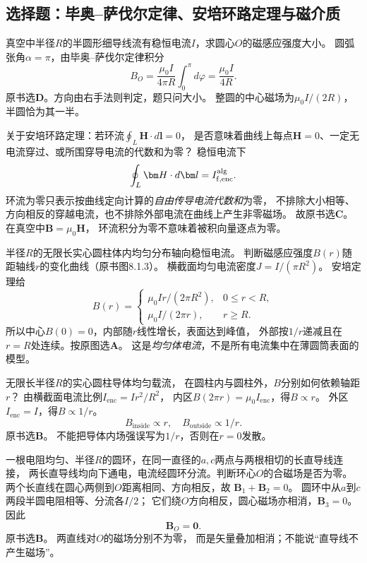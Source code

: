 \subsection{选择题：毕奥--萨伐尔定律、安培环路定理与磁介质}

\problemtext 真空中半径$R$的半圆形细导线流有稳恒电流$I$，求圆心$O$的磁感应强度大小。
\workings
圆弧张角$\alpha=\pi$，由毕奥--萨伐尔定律积分
\[
 B_O=\frac{\mu_0 I}{4\pi R}\int_0^\pi d\varphi
 =\boxed{\frac{\mu_0 I}{4R}}.
\]
原书选\textbf{D}。方向由右手法则判定，题只问大小。
\crosscheck 整圆的中心磁场为$\mu_0I/(2R)$，半圆恰为其一半。

\problemtext 关于安培环路定理：若环流$\oint_L\bm H\cdot d\bm l=0$，
是否意味着曲线上每点$\bm H=0$、一定无电流穿过、或所围穿导电流的代数和为零？
\workings
稳恒电流下
\[
\oint_L\bm H\cdot d\bm l=I_{\mathrm f,\mathrm{enc}}^{\rm alg}.
\]
环流为零只表示按曲线定向计算的\emph{自由传导电流代数和}为零，
不排除大小相等、方向相反的穿越电流，也不排除外部电流在曲线上产生非零磁场。
故原书选\textbf{C}。
\crosscheck 在真空中$\bm B=\mu_0\bm H$，
环流积分为零不意味着被积向量逐点为零。

\problemtext 半径$R$的无限长实心圆柱体内均匀分布轴向稳恒电流。
判断磁感应强度$B(r)$随距轴线$r$的变化曲线（原书图8.1.3）。
\workings
横截面均匀电流密度$J=I/(\pi R^2)$。
安培定理给
\[
\boxed{B(r)=
\begin{cases}
\mu_0Ir/(2\pi R^2),&0\le r<R,\\
\mu_0I/(2\pi r),&r\ge R.
\end{cases}}
\]
所以中心$B(0)=0$，内部随$r$线性增长，表面达到峰值，
外部按$1/r$递减且在$r=R$处连续。按原图选\textbf{A}。
\crosscheck 这是\emph{均匀体电流}，不是所有电流集中在薄圆筒表面的模型。

\problemtext 无限长半径$R$的实心圆柱导体均匀载流，
在圆柱内与圆柱外，$B$分别如何依赖轴距$r$？
\workings
由横截面电流比例$I_{\mathrm{enc}}=I r^2/R^2$，
内区$B(2\pi r)=\mu_0I_{\mathrm{enc}}$，得$B\propto r$。
外区$I_{\mathrm{enc}}=I$，得$B\propto1/r$。
\[
\boxed{B_{\mathrm{inside}}\propto r,\quad B_{\mathrm{outside}}\propto1/r}.
\]
原书选\textbf{B}。
\crosscheck 不能把导体内场强误写为$1/r$，否则在$r=0$发散。

\problemtext 一根电阻均匀、半径$R$的圆环，在同一直径的$a,c$两点与两根相切的长直导线连接，
两长直导线均向下通电，电流经圆环分流。判断环心$O$的合磁场是否为零。
\workings
两个长直线在圆心两侧到$O$距离相同、方向相反，故
$\bm B_1+\bm B_2=0$。
圆环中从$a$到$c$两段半圆电阻相等、分流各$I/2$；
它们绕$O$方向相反，圆心磁场亦相消，$\bm B_3=0$。
因此
\[
\boxed{\bm B_O=\bm0}.
\]
原书选\textbf{B}。
\crosscheck 两直线对$O$的磁场分别不为零，
而是矢量叠加相消；不能说“直导线不产生磁场”。

